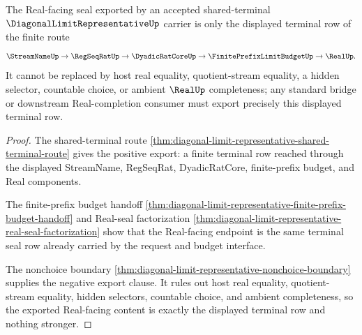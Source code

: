 \begin{theorem}
\label{thm:diagonal-limit-representative-real-seal-nonchoice-export}
The Real-facing seal exported by an accepted shared-terminal $\DiagonalLimitRepresentativeUp$ carrier is only the displayed terminal row of the finite route
$$
\StreamNameUp \to \RegSeqRatUp \to \DyadicRatCoreUp \to \FinitePrefixLimitBudgetUp \to \RealUp.
$$
It cannot be replaced by host real equality, quotient-stream equality, a hidden selector, countable choice, or ambient $\RealUp$ completeness; any standard bridge or downstream Real-completion consumer must export precisely this displayed terminal row.
\end{theorem}
\begin{proof}
The shared-terminal route \autoref{thm:diagonal-limit-representative-shared-terminal-route} gives the positive export: a finite terminal row reached through the displayed StreamName, RegSeqRat, DyadicRatCore, finite-prefix budget, and Real components.

The finite-prefix budget handoff \autoref{thm:diagonal-limit-representative-finite-prefix-budget-handoff} and Real-seal factorization \autoref{thm:diagonal-limit-representative-real-seal-factorization} show that the Real-facing endpoint is the same terminal seal row already carried by the request and budget interface.

The nonchoice boundary \autoref{thm:diagonal-limit-representative-nonchoice-boundary} supplies the negative export clause. It rules out host real equality, quotient-stream equality, hidden selectors, countable choice, and ambient completeness, so the exported Real-facing content is exactly the displayed terminal row and nothing stronger.
\end{proof}

